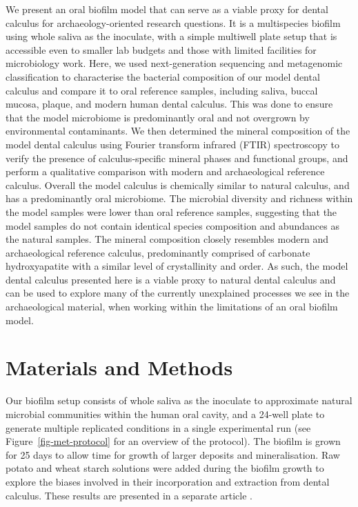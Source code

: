 \documentclass[10pt,a4paper]{article}
\begin{document}
We present an oral biofilm model that can serve as a viable proxy for
dental calculus for archaeology-oriented research questions. It is a
multispecies biofilm using whole saliva as the inoculate, with a simple
multiwell plate setup that is accessible even to smaller lab budgets and
those with limited facilities for microbiology work. Here, we used
next-generation sequencing and metagenomic classification to
characterise the bacterial composition of our model dental calculus and
compare it to oral reference samples, including saliva, buccal mucosa,
plaque, and modern human dental calculus. This was done to ensure that
the model microbiome is predominantly oral and not overgrown by
environmental contaminants. We then determined the mineral composition
of the model dental calculus using Fourier transform infrared (FTIR)
spectroscopy to verify the presence of calculus-specific mineral phases
and functional groups, and perform a qualitative comparison with modern
and archaeological reference calculus. Overall the model calculus is
chemically similar to natural calculus, and has a predominantly oral
microbiome. The microbial diversity and richness within the model
samples were lower than oral reference samples, suggesting that the
model samples do not contain identical species composition and
abundances as the natural samples. The mineral composition closely
resembles modern and archaeological reference calculus, predominantly
comprised of carbonate hydroxyapatite with a similar level of
crystallinity and order. As such, the model dental calculus presented
here is a viable proxy to natural dental calculus and can be used to
explore many of the currently unexplained processes we see in the
archaeological material, when working within the limitations of an oral
biofilm model.

\section*{Materials and Methods}\label{materials-and-methods}

Our biofilm setup consists of whole saliva as the inoculate to
approximate natural microbial communities within the human oral cavity,
and a 24-well plate to generate multiple replicated conditions in a
single experimental run (see Figure~\ref{fig-met-protocol} for an
overview of the protocol). The biofilm is grown for 25 days to allow
time for growth of larger deposits and mineralisation. Raw potato and
wheat starch solutions were added during the biofilm growth to explore
the biases involved in their incorporation and extraction from dental
calculus. These results are presented in a separate article
\citep{bartholdyInvestigatingBiases2022}.
\end{document}

